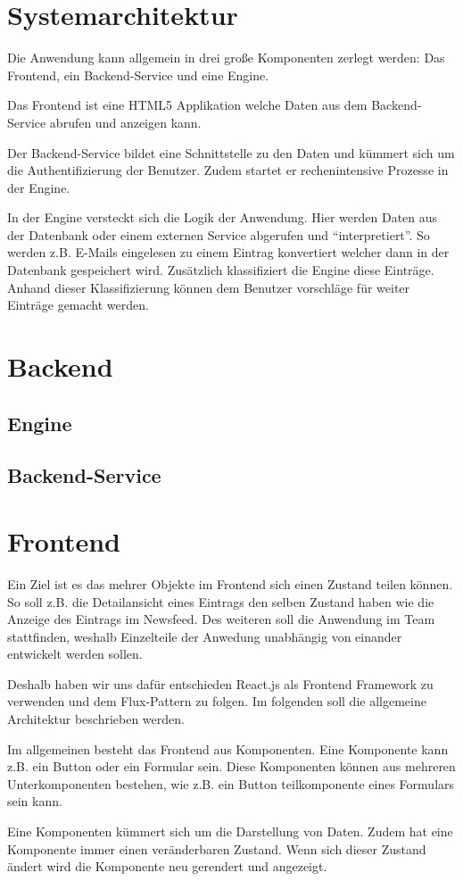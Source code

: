 \chapter{Systemarchitektur}
Die Anwendung kann allgemein in drei große Komponenten zerlegt werden: Das Frontend, ein Backend-Service und eine Engine.

Das Frontend ist eine HTML5 Applikation welche Daten aus dem Backend-Service abrufen und anzeigen kann.

Der Backend-Service bildet eine Schnittstelle zu den Daten und kümmert sich um die Authentifizierung der Benutzer.
Zudem startet er rechenintensive Prozesse in der Engine.

In der Engine versteckt sich die Logik der Anwendung. Hier werden Daten aus der Datenbank oder einem externen Service abgerufen und \enquote{interpretiert}.
So werden z.B. E-Mails eingelesen zu einem Eintrag konvertiert welcher dann in der Datenbank gespeichert wird.
Zusätzlich klassifiziert die Engine diese Einträge. Anhand dieser Klassifizierung können dem Benutzer vorschläge für weiter Einträge gemacht werden.

\chapter{Backend}

\section{Engine}

\section{Backend-Service}


\chapter{Frontend}

Ein Ziel ist es das mehrer Objekte im Frontend sich einen Zustand teilen können. So soll z.B. die Detailansicht eines Eintrags den selben Zustand haben wie
die Anzeige des Eintrags im Newsfeed.
Des weiteren soll die Anwendung im Team stattfinden, weshalb Einzelteile der Anwedung unabhängig von einander entwickelt werden sollen.

Deshalb haben wir uns dafür entschieden React.js als Frontend Framework zu verwenden und dem Flux-Pattern zu folgen.
Im folgenden soll die allgemeine Architektur beschrieben werden.

Im allgemeinen besteht das Frontend aus Komponenten. Eine Komponente kann z.B. ein Button oder ein Formular sein.
Diese Komponenten können aus mehreren Unterkomponenten bestehen, wie z.B. ein Button teilkomponente eines Formulars sein kann.

Eine Komponenten kümmert sich um die Darstellung von Daten. Zudem hat eine Komponente immer einen veränderbaren Zustand. 
Wenn sich dieser Zustand ändert wird die Komponente neu gerendert und angezeigt.
